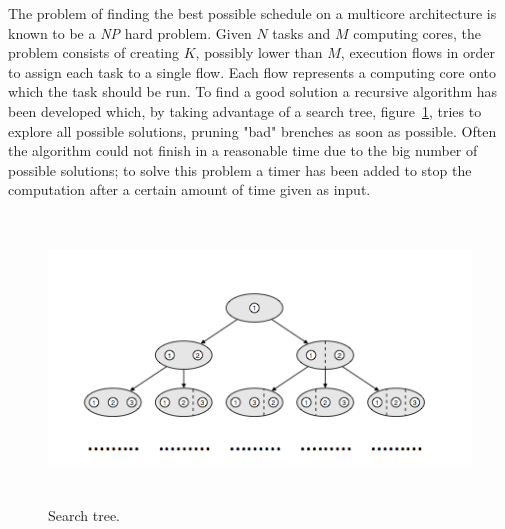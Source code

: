 \documentclass[a4paper,12pt,oneside]{book}
\begin{document}
The problem of finding the best possible schedule on a multicore architecture is known to be a \emph{NP} hard problem. Given $N$ tasks and $M$ computing cores, the problem consists of creating $K$, possibly lower than $M$, execution flows in order to assign each task to a single flow. Each flow represents a computing core onto which the task should be run. To find a good solution a recursive algorithm has been developed which, by taking advantage of a search tree, figure~\ref{search_tree}, tries to explore all possible solutions, pruning "bad" brenches as soon as possible. Often the algorithm could not finish in a reasonable time due to the big number of possible solutions; to solve this problem a timer has been added to stop the computation after a certain amount of time given as input.

\begin{figure}
\centering
\includegraphics[width = 130mm, height = 76mm]{search_tree.png}
\caption{Search tree.}
\label{search_tree}
\end{figure}
\end{document}
